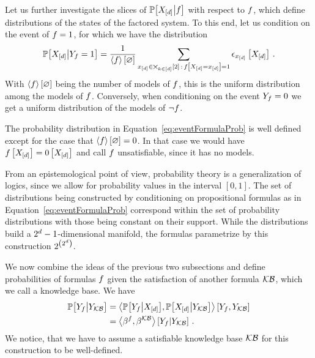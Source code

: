 Let us further investigate the slices of $\mathbb{P}\big[X_{[d]}\big|f\big]$ with respect to $f$, which define distributions of the states of the factored system.
To this end, let us condition on the event of $f=1$, for which we have the distribution
\begin{align}
    \label{eq:eventFormulaProb}
    \mathbb{P}\big[X_{[d]}\big|Y_{f}=1\big] = \frac{1}{\left\langle f\right\rangle \left[ \varnothing \right]}
    \sum_{x_{[d]}\in\bigtimes_{k\in[d]}[2] \,:\, f\left[X_{[d]}=x_{[d]}\right]=1} \epsilon_{x_{[d]}}\left[X_{[d]}\right] \, .
\end{align}
With $\left\langle f\right\rangle \left[ \varnothing \right]$ being the number of models of $f$, this is the uniform distribution among the models of $f$.
Conversely, when conditioning on the event $Y_{f}=0$ we get a uniform distribution of the models of $\lnot f$.

% 
The probability distribution in Equation~\eqref{eq:eventFormulaProb} is well defined except for the case that $\left\langle f\right\rangle \left[ \varnothing \right]=0$.
In that case we would have $f\left[X_{[d]}\right]=0\left[X_{[d]}\right]$ and call $f$ unsatisfiable, since it has no models.

From an epistemological point of view, probability theory is a generalization of logics, since we allow for probability values in the interval $[0,1]$.
The set of distributions being constructed by conditioning on propositional formulas as in Equation~\eqref{eq:eventFormulaProb} correspond within the set of probability distributions with those being constant on their support.
While the distributions build a $2^d-1$-dimensional manifold, the formulas parametrize by this construction $2^{\left(2^d\right)}$.%





We now combine the ideas of the previous two subsections and define probabilities of formulas $f$ given the satisfaction of another formula $\mathcal{KB}$, which we call a knowledge base.
We have %
\begin{align*}
    \mathbb{P}\big[Y_{f}\big|Y_{\mathcal{KB}}\big]
    & = \left\langle 
        \mathbb{P}\big[Y_{f}\big|X_{[d]}\big], \mathbb{P}\big[X_{[d]}\big|Y_{\mathcal{KB}}\big]
    \right\rangle \left[ Y_{f},Y_{\mathcal{KB}} \right] \\
    & = \left\langle \beta^{f},\beta^{\mathcal{KB}}\right\rangle \left[ Y_{f} | Y_{\mathcal{KB}} \right] \, .
\end{align*}
We notice, that we have to assume a satisfiable knowledge base $\mathcal{KB}$ for this construction to be well-defined.

